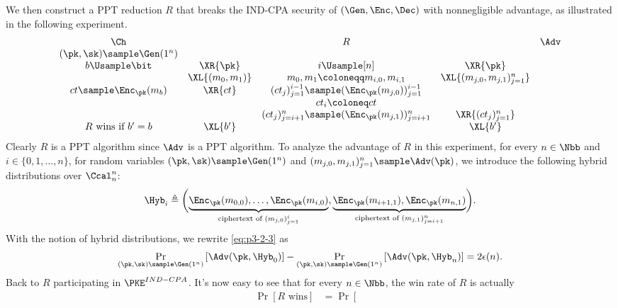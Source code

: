 \begin{answer}[ii]
    
    We then construct a PPT reduction $R$ that breaks the IND-CPA security of $(\Gen, \Enc, \Dec)$ with nonnegligible advantage, as illustrated in the following experiment.
    {
        \[
            \begin{array}{@{} c c c c c@{}}
            \Ch & & R & & \Adv \\
            (\pk, \sk)\sample \Gen(1^n) & &  & & \\
            b\Usample\bit & \XR{\pk} & i\Usample [n]  & \XR{\pk} &\\
            & \XL{(m_0, m_1)} & m_0, m_1\coloneqq m_{i, 0}, m_{i,1}   & \XL{(m_{j,0},m_{j,1})_{j=1}^n} & \\
            ct\sample \Enc_\pk(m_{b}) & \XR{ct}&  (ct_{j})_{j=1}^{i-1}\sample (\Enc_\pk (m_{j, 0}))_{j=1}^{i-1}  &  &\\
            && ct_{i}\coloneq ct &&\\
            && (ct_{j})_{j=i+1}^n\sample (\Enc_\pk (m_{j, 1}))_{j=i+1}^n  &\XR{(ct_{j})_{j=1}^n} &\\
            \text{$R$ wins if $b' = b$} & \XL{b'} & & \XL{b'} & \\
            \end{array}
        \]
        \label{fig:p3-game5}
    }
    Clearly $R$ is a PPT algorithm since $\Adv$ is a PPT algorithm. To analyze the advantage of $R$ in this experiment, for every $n\in\Nbb$ and $i\in \{0,1,\ldots, n\}$, for random variables $(\pk, \sk)\sample \Gen(1^n)$ and $(m_{j,0},m_{j,1})_{j=1}^n \sample \Adv(\pk)$, we introduce the following hybrid distributions over $\Ccal_n^n$:
    \[
        \Hyb_i\triangleq \biggl( \underbrace{\Enc_\pk (m_{0, 0}), \ldots, \Enc_\pk (m_{i, 0})}_{\textrm{ciphertext of } (m_{j, 0})_{j=1}^{i} }, \underbrace{\Enc_\pk (m_{i+1, 1}), \Enc_\pk (m_{n, 1})}_{\textrm{ciphertext of } (m_{j, 1})_{j=i+1}^{n} }  \biggr).
    \]
    With the notion of hybrid distributions, we rewrite \eqref{eq:p3-2-3}  as
    \begin{equation}\label{eq:p3-2-4}
        \Pr_{(\pk, \sk)\sample \Gen(1^n)}\left[\Adv(\pk, \Hyb_0)\right]
        -\Pr_{(\pk, \sk)\sample \Gen(1^n)}\left[\Adv(\pk, \Hyb_n)\right]
        =2\epsilon(n).
    \end{equation}
    Back to $R$ participating in $\PKE^{IND-CPA}$. It's now easy to see that for every $n\in\Nbb$, the win rate of $R$ is actually
    \begin{align*}
        \Pr[R\textrm{ wins}]
        &= \Pr\left[\begin{gathered}

\end{gathered}
\end{align*}
\end{answer}
